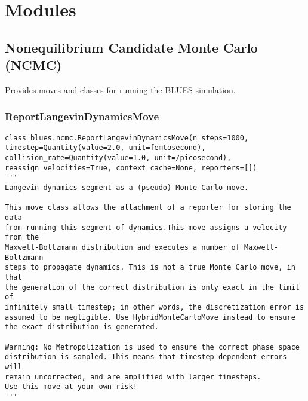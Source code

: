 \hypertarget{modules}{%
\section{Modules}\label{modules}}


\hypertarget{nonequilibrium-candidate-monte-carlo-ncmc}{%
\subsection{Nonequilibrium Candidate Monte Carlo (NCMC)}\label{nonequilibrium-candidate-monte-carlo-ncmc}}

Provides moves and classes for running the BLUES simulation.

\hypertarget{reportlangevindynamicsmove}{%
\subsubsection{ReportLangevinDynamicsMove}\label{reportlangevindynamicsmove}}

\begin{verbatim}
class blues.ncmc.ReportLangevinDynamicsMove(n_steps=1000, timestep=Quantity(value=2.0, unit=femtosecond), collision_rate=Quantity(value=1.0, unit=/picosecond), reassign_velocities=True, context_cache=None, reporters=[])
'''
Langevin dynamics segment as a (pseudo) Monte Carlo move.

This move class allows the attachment of a reporter for storing the data
from running this segment of dynamics.This move assigns a velocity from the
Maxwell-Boltzmann distribution and executes a number of Maxwell-Boltzmann
steps to propagate dynamics. This is not a true Monte Carlo move, in that
the generation of the correct distribution is only exact in the limit of
infinitely small timestep; in other words, the discretization error is
assumed to be negligible. Use HybridMonteCarloMove instead to ensure
the exact distribution is generated.

Warning: No Metropolization is used to ensure the correct phase space
distribution is sampled. This means that timestep-dependent errors will
remain uncorrected, and are amplified with larger timesteps.
Use this move at your own risk!
'''
\end{verbatim}

